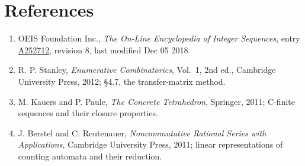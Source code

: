 \documentclass[11pt]{article}
\theoremstyle{definition}
\begin{document}
\section{References}

\begin{enumerate}

\item OEIS Foundation Inc., \emph{The On-Line Encyclopedia of Integer Sequences}, entry \href{https://oeis.org/A252712}{A252712}, revision 8, last modified Dec 05 2018.

\item R. P. Stanley, \emph{Enumerative Combinatorics}, Vol.~1, 2nd ed., Cambridge University Press, 2012; \S4.7, the transfer-matrix method.

\item M. Kauers and P. Paule, \emph{The Concrete Tetrahedron}, Springer, 2011; C-finite sequences and their closure properties.

\item J. Berstel and C. Reutenauer, \emph{Noncommutative Rational Series with Applications}, Cambridge University Press, 2011; linear representations of counting automata and their reduction.

\end{enumerate}
\end{document}
